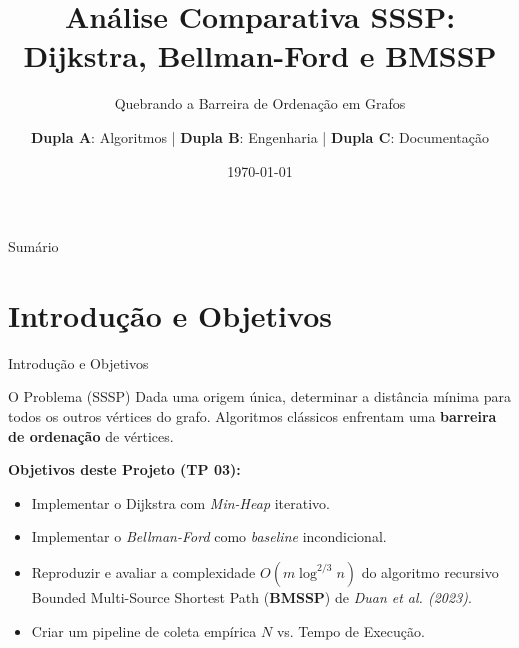 \documentclass[aspectratio=169, 11pt]{beamer}
\title[SSSP Algoritmos]{Análise Comparativa SSSP: \\ Dijkstra, Bellman-Ford e BMSSP}
\subtitle{Quebrando a Barreira de Ordenação em Grafos}
\author[Equipe SSSP]{
  \textbf{Dupla A}: Algoritmos | \textbf{Dupla B}: Engenharia | \textbf{Dupla C}: Documentação
}
\institute[UNIFAL-MG]{Universidade Federal de Alfenas -- UNIFAL-MG}
\date{\today}
\begin{document}
\begin{frame}
    \titlepage
\end{frame}

\begin{frame}{Sumário}
    \tableofcontents
\end{frame}

\section{Introdução e Objetivos}
\begin{frame}{Introdução e Objetivos}
    \begin{block}{O Problema (SSSP)}
        Dada uma origem única, determinar a distância mínima para todos os outros vértices do grafo. Algoritmos clássicos enfrentam uma \textbf{barreira de ordenação} de vértices.
    \end{block}
    
    \vspace{0.5cm}
    \textbf{Objetivos deste Projeto (TP 03):}
    \begin{itemize}
        \item Implementar o Dijkstra com \textit{Min-Heap} iterativo.
        \item Implementar o \textit{Bellman-Ford} como \textit{baseline} incondicional.
        \item Reproduzir e avaliar a complexidade $O(m \log^{2/3} n)$ do algoritmo recursivo Bounded Multi-Source Shortest Path (\textbf{BMSSP}) de \textit{Duan et al. (2023)}.
        \item Criar um pipeline de coleta empírica $N$ vs. Tempo de Execução.
    \end{itemize}
\end{frame}

\end{document}

